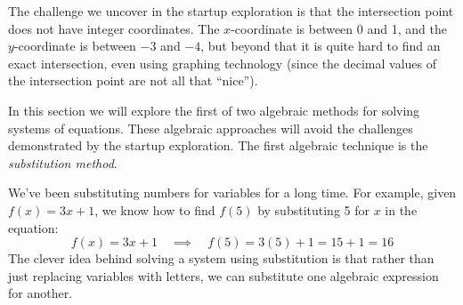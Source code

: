 The challenge we uncover in the startup exploration is that the intersection point does not have integer coordinates. The $x$-coordinate is between 0 and 1, and the $y$-coordinate is between $-3$ and $-4$, but beyond that it is quite hard to find an exact intersection, even using graphing technology (since the decimal values of the intersection point are not all that ``nice'').

\begin{center}
\end{center}


In this section we will explore the first of two algebraic methods for solving systems of equations. These algebraic approaches will avoid the challenges demonstrated by the startup exploration. The first algebraic technique is the \textit{substitution method}.

We've been substituting numbers for variables for a long time. For example, given $f(x) = 3x + 1$, we know how to find $f(5)$ by substituting 5 for $x$ in the equation: \[f(x) = 3x+1 \quad\implies\quad f(5) = 3(5)+1 = 15 + 1 = 16\] The clever idea behind solving a system using substitution is that rather than just replacing variables with letters, we can substitute one algebraic expression for another.

